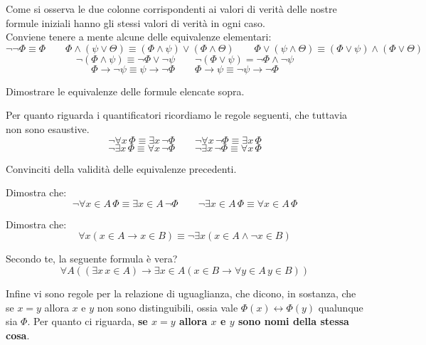 \documentclass[11pt]{scrartcl}
\begin{document}
Come si osserva le due colonne corrispondenti ai valori di verità delle nostre formule iniziali hanno gli stessi valori di verità in ogni caso.\\
Conviene tenere a mente alcune delle equivalenze elementari:
\[ \neg\neg \Phi \equiv \Phi \qquad \Phi \land (\psi \lor \Theta) \equiv (\Phi \land \psi) \lor (\Phi \land \Theta) \qquad \Phi \lor (\psi \land \Theta) \equiv (\Phi \lor \psi) \land (\Phi \lor \Theta)
	\]\[ \neg(\Phi \land \psi) \equiv \neg \Phi \lor \neg \psi \qquad \neg(\Phi \lor \psi) = \neg \Phi \land \neg \psi
		\]\[ \Phi \rightarrow \neg \psi \equiv \psi \rightarrow \neg \Phi \qquad \Phi \rightarrow \psi \equiv \neg \psi \rightarrow \neg \Phi
			\]

\begin{exercise}
Dimostrare le equivalenze delle formule elencate sopra.
\end{exercise}

Per quanto riguarda i quantificatori ricordiamo le regole seguenti, che tuttavia non sono esaustive.
\[ \neg\forall x \, \Phi \equiv \exists x \, \neg\Phi \qquad \neg\forall x \, \neg \Phi \equiv \exists x \, \Phi
	\]\[ \neg\exists x \, \Phi \equiv \forall x \, \neg \Phi \qquad \neg \exists x \, \neg \Phi \equiv \forall x \, \Phi
		\]

\begin{exercise}
Convinciti della validità delle equivalenze precedenti.
\end{exercise}

\begin{exercise}
Dimostra che:
\[ \neg \forall x \in A \, \Phi \equiv \exists x \in A \, \neg \Phi \qquad \neg \exists x \in A \, \Phi \equiv \forall x \in A \, \Phi
	\]
\end{exercise}

\begin{exercise}
Dimostra che:
\[ \forall x (x \in A \rightarrow x \in B) \equiv \neg \exists x (x \in A \land \neg x \in B)
	\]
\end{exercise}

\begin{exercise}
Secondo te, la seguente formula è vera?
\[ \forall A ((\exists x \, x \in A) \rightarrow \exists x \in A (x \in B \rightarrow \forall y \in A \, y \in B))
	\]
\end{exercise}

Infine vi sono regole per la relazione di uguaglianza, che dicono, in sostanza, che se $x = y$ allora $x$ e $y$ non sono distinguibili, ossia vale $\Phi(x) \leftrightarrow \Phi(y)$ qualunque sia $\Phi$.
Per quanto ci riguarda, \textbf{se $x = y$ allora $x$ e $y$ sono nomi della stessa cosa}.
\end{document}
